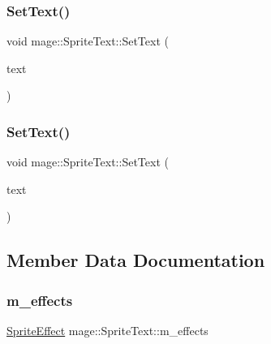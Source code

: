 \hypertarget{classmage_1_1_sprite_text_a03d5012e2812d422a1285a4a0abb104f}{}\label{classmage_1_1_sprite_text_a03d5012e2812d422a1285a4a0abb104f} 
\subsubsection{\texorpdfstring{Set\+Text()}{SetText()}\hspace{0.1cm}{\footnotesize\ttfamily [2/3]}}
{\footnotesize\ttfamily void mage\+::\+Sprite\+Text\+::\+Set\+Text (\begin{DoxyParamCaption}\item[{const wchar\+\_\+t $\ast$}]{text }\end{DoxyParamCaption})}

\hypertarget{classmage_1_1_sprite_text_ab9f28cf44b29b8489794938a8965f104}{}\label{classmage_1_1_sprite_text_ab9f28cf44b29b8489794938a8965f104} 
\subsubsection{\texorpdfstring{Set\+Text()}{SetText()}\hspace{0.1cm}{\footnotesize\ttfamily [3/3]}}
{\footnotesize\ttfamily void mage\+::\+Sprite\+Text\+::\+Set\+Text (\begin{DoxyParamCaption}\item[{const \hyperlink{structmage_1_1_sprite_text_item}{Sprite\+Text\+Item} \&}]{text }\end{DoxyParamCaption})}



\subsection{Member Data Documentation}
\hypertarget{classmage_1_1_sprite_text_a5fdeb8c2f30482e2c89d892aeb43c50b}{}\label{classmage_1_1_sprite_text_a5fdeb8c2f30482e2c89d892aeb43c50b} 
\subsubsection{\texorpdfstring{m\+\_\+effects}{m\_effects}}
{\footnotesize\ttfamily \hyperlink{namespacemage_a9cfe18123066ba4236f548f9de75d881}{Sprite\+Effect} mage\+::\+Sprite\+Text\+::m\+\_\+effects\hspace{0.3cm}{\ttfamily [private]}}

